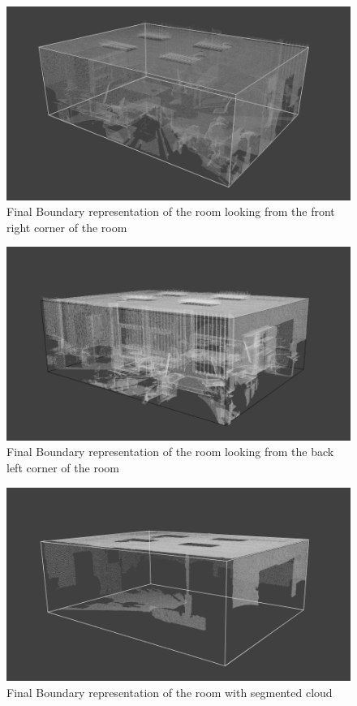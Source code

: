 			\begin{figure}[H]
			\centering
			\includegraphics[width=1\linewidth]{Includes/images/f/full4}
			\caption{Final Boundary representation of the room looking from the front right corner of the room}
			\label{fig:full2}
			\end{figure}

			\begin{figure}[H]
			\centering
			\includegraphics[width=1\linewidth]{Includes/images/f/full2}
			\caption{Final Boundary representation of the room looking from the back left corner of the room}
			\label{fig:full3}
			\end{figure}
			
			
			\begin{figure}[H]
			\centering
			\includegraphics[width=1\linewidth]{Includes/images/f/untitled}
			\caption{Final Boundary representation of the room with segmented cloud}
			\label{fig:untitled}
			\end{figure}
			
